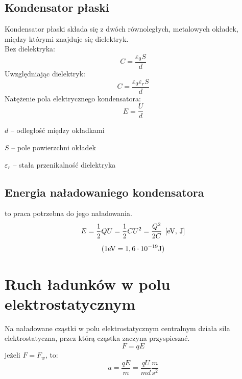     \subsection{Kondensator płaski}
      \begin{definition}
        Kondensator płaski składa się z dwóch równoległych, metalowych okładek, między którymi znajduje się dielektryk.\\[1.5em]
        Bez dielektryka:
        \begin{equation*}
          C = \frac{\varepsilon_0S}{d}
        \end{equation*}
        Uwzględniając dielektryk:
        \begin{equation*}
          C = \frac{\varepsilon_0\varepsilon_rS}{d}
        \end{equation*}
        Natężenie pola elektrycznego kondensatora:
        \begin{equation*}
          E = \frac Ud
        \end{equation*}
        \begin{symbols}
          \item $d$ -- odległość między okładkami
          \item $S$ -- pole powierzchni okładek
          \item $\varepsilon_r$ -- stała przenikalność dielektryka
        \end{symbols}
      \end{definition}

    \subsection{Energia naładowaniego kondensatora}
      \begin{definition}
         to praca potrzebna do jego naładowania.
        \begin{gather*}
          E = \frac{1}{2}QU = \frac{1}{2}CU^2 = \frac{Q^2}{2C} \;\left[\mathrm{eV},\,\mathrm{J}\right]\\[0.5em]
          (1\mathrm{eV} = 1,6\cdot 10^{-19}\mathrm{J})
        \end{gather*}
      \end{definition}
  \section{Ruch ładunków w polu elektrostatycznym}
    Na naładowane cząstki w polu elektrostatycznym centralnym działa siła elektrostatyczna, przez którą cząstka zaczyna przyspieszać.
    \begin{equation*}
      F = qE
    \end{equation*}
    jeżeli $F = F_w$, to:
    \begin{equation*}
      a = \frac{qE}{m} = \frac{qU}{md} \unit{\frac{m}{s^2}}
    \end{equation*}

